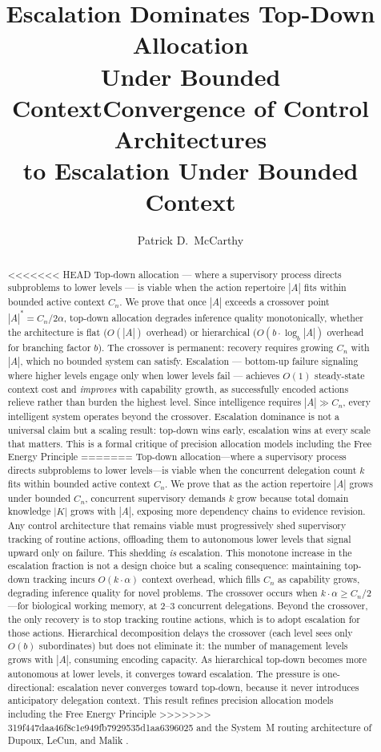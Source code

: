 \documentclass[11pt]{article}
\title{Escalation Dominates Top-Down Allocation\\Under Bounded Context}
\title{Convergence of Control Architectures\\to Escalation Under Bounded Context}
\author{Patrick D.\ McCarthy}
\date{}
\theoremstyle{definition}
\begin{document}
\maketitle

\begin{abstract}
<<<<<<< HEAD
Top-down allocation --- where a supervisory process directs
subproblems to lower levels --- is viable when the action repertoire
$|A|$ fits within bounded active context $C_n$. We prove that once
$|A|$ exceeds a crossover point $|A|^* = C_n / 2\alpha$, top-down
allocation degrades inference quality monotonically, whether the
architecture is flat ($O(|A|)$ overhead) or hierarchical ($O(b \cdot
\log_b |A|)$ overhead for branching factor $b$). The crossover is
permanent: recovery requires growing $C_n$ with $|A|$, which no
bounded system can satisfy. Escalation --- bottom-up failure signaling
where higher levels engage only when lower levels fail --- achieves
$O(1)$ steady-state context cost and \emph{improves} with capability
growth, as successfully encoded actions relieve rather than burden
the highest level. Since intelligence requires $|A| \gg C_n$, every
intelligent system operates beyond the crossover. Escalation dominance
is not a universal claim but a scaling result: top-down wins early,
escalation wins at every scale that matters. This is a formal critique
of precision allocation models including the Free Energy Principle
=======
Top-down allocation---where a supervisory process directs subproblems
to lower levels---is viable when the concurrent delegation count $k$
fits within bounded active context $C_n$. We prove that as the action repertoire $|A|$ grows under bounded
$C_n$, concurrent supervisory demands $k$ grow because total domain
knowledge $|K|$ grows with $|A|$, exposing more dependency chains to
evidence revision. Any control architecture that remains viable must
progressively shed supervisory tracking of routine actions, offloading
them to autonomous lower levels that signal upward only on failure. This shedding \emph{is} escalation.
This monotone increase in the escalation fraction is not a design
choice but a scaling consequence:
maintaining top-down tracking incurs $O(k \cdot \alpha)$ context
overhead, which fills $C_n$ as capability grows, degrading inference
quality for novel problems. The crossover occurs when $k \cdot \alpha
\geq C_n / 2$---for biological working memory, at 2--3 concurrent
delegations. Beyond the crossover, the only recovery is to stop
tracking routine actions, which is to adopt escalation for those
actions. Hierarchical decomposition delays the crossover (each level
sees only $O(b)$ subordinates) but does not eliminate it: the number
of management levels grows with $|A|$, consuming encoding capacity.
As hierarchical top-down becomes more autonomous at lower levels, it
converges toward escalation. The pressure is one-directional:
escalation never converges toward top-down, because it never
introduces anticipatory delegation context. This result refines
precision allocation models including the Free Energy Principle
>>>>>>> 319f447daa46f8c1e949fb7929535d1aa6396025
\cite{Friston2010,Friston2017} and the System~M routing architecture
of Dupoux, LeCun, and Malik \cite{DupouxLeCunMalik2026}.
\end{abstract}
\end{document}
